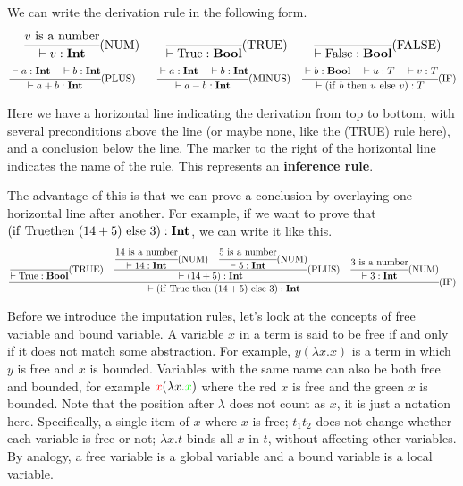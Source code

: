 \documentclass[a4paper]{exam}
\begin{document}
We can write the derivation rule in the following form.
$$
  \cfrac{v{\rm\ is\ a\ number}}{\vdash v:{\bf Int}}{\rm\tiny(NUM)}
  \qquad\cfrac{}{\vdash {\rm True}:{\bf Bool}}{\rm\tiny(TRUE)}
  \qquad\cfrac{}{\vdash {\rm False}:{\bf Bool}}{\rm\tiny(FALSE)}
$$
$$
  \cfrac{\vdash a:{\bf Int}\quad\vdash b:{\bf Int}}{\vdash a+b:{\bf Int}}{\rm\tiny(PLUS)}
  \qquad\cfrac{\vdash a:{\bf Int}\quad\vdash b:{\bf Int}}{\vdash a-b:{\bf Int}}{\rm\tiny(MINUS)}
  \quad\cfrac{\vdash b:{\bf Bool}\quad\vdash u:T\quad\vdash v:T}{\vdash ({\rm if}\ b\ {\rm then}\ u\ {\rm else}\ v):T}{\rm\tiny(IF)}
$$

Here we have a horizontal line indicating the derivation from top to bottom, with several preconditions above the line (or maybe none, like the (TRUE) rule here), and a conclusion below the line. The marker to the right of the horizontal line indicates the name of the rule. This represents an \textbf{inference rule}.

The advantage of this is that we can prove a conclusion by overlaying one horizontal line after another. For example, if we want to prove that $({\rm if\ True\\ then}\ (14+5)\ {\rm else}\ 3):{\bf Int}$, we can write it like this.
$$
  \cfrac{
  \cfrac{}{\vdash {\rm True}:{\bf Bool}}{\rm\tiny(TRUE)}
  \quad\cfrac{
  \cfrac{14{\rm\ is\ a\ number}}{\vdash 14:{\bf Int}}{\rm\tiny(NUM)}
  \quad\cfrac{5{\rm\ is\ a\ number}}{\vdash 5:{\bf Int}}{\rm\tiny(NUM)}
  }{\vdash (14+5):{\bf Int}}{\rm\tiny(PLUS)}
  \quad\cfrac{3{\rm\ is\ a\ number}}{\vdash 3:{\bf Int}}{\rm\tiny(NUM)}
  }{\vdash ({\rm if\ True\ then}\ (14+5)\ {\rm else}\ 3):{\bf Int}}{\rm\tiny(IF)}
$$

Before we introduce the imputation rules, let's look at the concepts of free variable and bound variable.
A variable $x$ in a term is said to be free if and only if it does not match some abstraction. For example, $y(\lambda x . x)$ is a term in which $y$ is free and $x$ is bounded. Variables with the same name can also be both free and bounded, for example $\textcolor{red}{x}(\lambda x . \textcolor{green}{x})$ where the red $x$ is free and the green $x$ is bounded. Note that the position after $\lambda$ does not count as $x$, it is just a notation here.
Specifically, a single item of $x$ where $x$ is free; $t_{1} t_{2}$ does not change whether each variable is free or not; $\lambda x . t$ binds all $x$ in $t$, without affecting other variables.
By analogy, a free variable is a global variable and a bound variable is a local variable.
\end{document}
